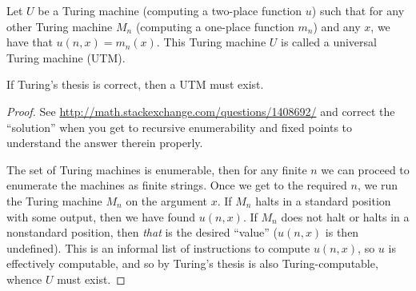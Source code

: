 \begin{exercise}[4.5]
  Let $U$ be a Turing machine (computing a two-place function $u$) such that for any other Turing machine $M_n$ (computing a one-place function $m_n$) and any $x$, we have that $u(n,x) = m_n(x)$.
  This Turing machine $U$ is called a universal Turing machine (UTM).

  If Turing's thesis is correct, then a UTM must exist.
\end{exercise}
\begin{proof}
  \tk See \href{http://math.stackexchange.com/questions/1408692/}{http://math.stackexchange.com/questions/1408692/} and correct the ``solution'' when you get to recursive enumerability and fixed points to understand the answer therein properly.

  The set of Turing machines is enumerable, then for any finite $n$ we can proceed to enumerate the machines as finite strings.
  Once we get to the required $n$, we run the Turing machine $M_n$ on the argument $x$.
  If $M_n$ halts in a standard position with some output, then we have found $u(n,x)$.
  If $M_n$ does not halt or halts in a nonstandard position, then \emph{that} is the desired ``value'' ($u(n,x)$ is then undefined).
  This is an informal list of instructions to compute $u(n,x)$, so $u$ is effectively computable, and so by Turing's thesis is also Turing-computable, whence $U$ must exist.
\end{proof}
